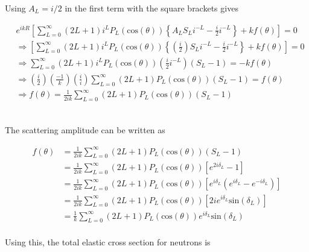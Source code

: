 \documentclass[paper=a4, fontsize=11pt]{scrartcl} %
\numberwithin{equation}{section} %
\numberwithin{figure}{section} %
\numberwithin{table}{section} %
\begin{document}
Using $A_{L}=i/2$ in the first term with the square brackets gives

\begin{align*}
&e^{ikR}\left[ \sum_{L=0}^{\infty}(2L+1)i^{L}P_{L}(\textrm{cos}(\theta)) \left\{A_{L}S_{L}i^{-L}-\frac{i}{2}i^{-L}\right\}+kf(\theta) \right]=0\\
&\Rightarrow \left[ \sum_{L=0}^{\infty}(2L+1)i^{L}P_{L}(\textrm{cos}(\theta)) \left\{\left(\frac{i}{2}\right)S_{L}i^{-L}-\frac{i}{2}i^{-L}\right\}+kf(\theta) \right]=0\\
&\Rightarrow \sum_{L=0}^{\infty}(2L+1)i^{L}P_{L}(\textrm{cos}(\theta))\left(\frac{i}{2}i^{-L}\right)(S_{L}-1) = -kf(\theta)\\
&\Rightarrow \left(\frac{i}{2}\right)\left(\frac{-1}{k}\right)\left(\frac{i}{i}\right)\sum_{L=0}^{\infty}(2L+1)P_{L}(\textrm{cos}(\theta))(S_{L}-1) = f(\theta)\\
&\Rightarrow f(\theta)=\frac{1}{2ik}\sum_{L=0}^{\infty}(2L+1)P_{L}(\textrm{cos}(\theta))(S_{L}-1)\\
\end{align*}

\subsection{}

The scattering amplitude can be written as

\begin{align*}
f(\theta)&=\frac{1}{2ik} \sum_{L=0}^{\infty} (2L+1)P_{L}(\textrm{cos}(\theta))(S_{L}-1)\\
&=\frac{1}{2ik} \sum_{L=0}^{\infty} (2L+1)P_{L}(\textrm{cos}(\theta))\left[ e^{2i\delta_{L}}-1\right]\\
&=\frac{1}{2ik} \sum_{L=0}^{\infty} (2L+1)P_{L}(\textrm{cos}(\theta))\left[ e^{i\delta_{L}}(e^{i\delta_{L}}-e^{-i\delta_{L}})\right]\\
&=\frac{1}{2ik} \sum_{L=0}^{\infty} (2L+1)P_{L}(\textrm{cos}(\theta))\left[ 2ie^{i\delta_{L}}\textrm{sin}(\delta_{L})\right]\\
&=\frac{1}{k} \sum_{L=0}^{\infty} (2L+1)P_{L}(\textrm{cos}(\theta))e^{i\delta_{L}}\textrm{sin}(\delta_{L})\\
\end{align*}

Using this, the total elastic cross section for neutrons is 
\end{document}

